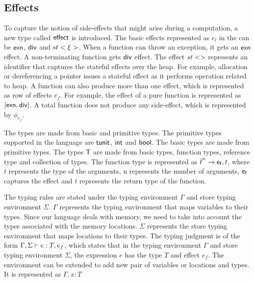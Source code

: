 \subsection{Effects}
To capture the notion of side-effects that might arise during a computation, a new type called ${\mathsf{effect}}$ is introduced. The basic effects represented as $e_l$ in the  can be ${\mathsf{exn}}$, ${\mathsf{div}}$ and $st<\xi>$. When a function can throw an exception, it gets an ${\mathsf{exn}}$ effect. A non-terminating function gets ${\mathsf{div}}$ effect. The effect $\hid$ represents an identifier that captures the stateful effects over the heap. For example, allocation or dereferencing a pointer issues a stateful effect as it performs operation related to heap.
A function can also produce more than one effect, which is represented as row of effects $\overline{e_f}$. For example, the effect of a pure function is represented as $[{\mathsf{exn}}, {\mathsf{div}}]$. A total function does not produce any side-effect, which is represented by $\phi_{e_f}$. 

The types are made from basic and primitive types. The primitive types supported in the language are ${\mathsf{tunit}}$, ${\mathsf{int}}$ and ${\mathsf{bool}}$. The basic types are made from primitive types. The types ${\mathsf{T}}$ are made from basic types, function types, reference type and collection of types. The function type is represented as $\overline{t}^n \rightarrow {\ensuremath{\mathsf{e_f}}}, t$, where $\overline{t}$ represents the type of the arguments, n represents the number of arguments, ${{\mathsf{e_f}}}$ captures the effect and $t$ represents the return type of the function.



The typing rules are stated under the typing environment $\Gamma$ and store typing environment $\Sigma$. $\Gamma$ represents the typing environment that maps variables to their types. Since our language deals with memory, we need to take into account the types associated with the memory locations. $\Sigma$ represents the store typing environment that maps locations to their types. The typing judgment is of the form $\Gamma,\Sigma \vdash e : T, e_f$, which states that in the typing environment $\Gamma$ and store typing environment $\Sigma$, the expression $e$ has the type $T$ and effect $e_f$. The environment can be extended to add new pair of variables or locations and types. It is represented as $\Gamma, x : T$

